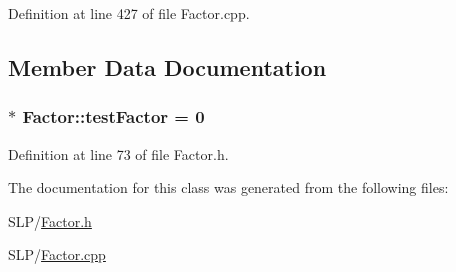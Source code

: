 Definition at line 427 of file Factor.\+cpp.



\subsection{Member Data Documentation}
\hypertarget{class_factor_ab9b06006dd838e95ac84c49ba6ae93bb}{
\subsubsection[{test\+Factor}]{ $\ast$ Factor\+::test\+Factor = 0\hspace{0.3cm}{\ttfamily [static]}}}\label{class_factor_ab9b06006dd838e95ac84c49ba6ae93bb}


Definition at line 73 of file Factor.\+h.



The documentation for this class was generated from the following files\+:\begin{DoxyCompactItemize}
\item 
S\+L\+P/\hyperlink{_factor_8h}{Factor.\+h}\item 
S\+L\+P/\hyperlink{_factor_8cpp}{Factor.\+cpp}\end{DoxyCompactItemize}
